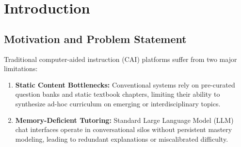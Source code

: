 \documentclass[12pt,a4paper]{article}
\begin{document}
\begin{abstract}
Personalized education demands scalable architectures that dynamically calibrate instructional difficulty, track student mastery across sessions, and produce structured, multi-format pedagogical content on demand. This report presents \textbf{GAI-PLA} (\textit{Generative AI-Based Personalized Learning Agent}), an end-to-end intelligent tutoring system built on a directed acyclic LangGraph state machine, powered by Google Gemini via an OpenAI-compatible structured gateway, and integrated with a decoupled vector memory store. Starting solely from an arbitrary subject query (e.g., \textit{``Pythagoras theorem''}), GAI-PLA constructs a hierarchical Knowledge Graph, executes an adaptive diagnostic quiz, evaluates concept-level deficiencies, and generates customized remedial Markdown lessons and 16:9 presentation slide decks with native PPTX export. The system features pluggable pedagogy styles (Feynman, Socratic, and Scaffolding) and an Ebbinghaus-decayed L2 reflection memory loop.
\end{abstract}

\section{Introduction}

\subsection{Motivation and Problem Statement}
Traditional computer-aided instruction (CAI) platforms suffer from two major limitations:
\begin{enumerate}
    \item \textbf{Static Content Bottlenecks:} Conventional systems rely on pre-curated question banks and static textbook chapters, limiting their ability to synthesize ad-hoc curriculum on emerging or interdisciplinary topics.
    \item \textbf{Memory-Deficient Tutoring:} Standard Large Language Model (LLM) chat interfaces operate in conversational silos without persistent mastery modeling, leading to redundant explanations or miscalibrated difficulty.
\end{enumerate}
\end{document}

